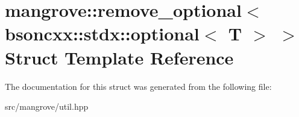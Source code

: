 \hypertarget{structmangrove_1_1remove__optional_3_01bsoncxx_1_1stdx_1_1optional_3_01T_01_4_01_4}{}\section{mangrove\+:\+:remove\+\_\+optional$<$ bsoncxx\+:\+:stdx\+:\+:optional$<$ T $>$ $>$ Struct Template Reference}
\label{structmangrove_1_1remove__optional_3_01bsoncxx_1_1stdx_1_1optional_3_01T_01_4_01_4}


The documentation for this struct was generated from the following file\+:\begin{DoxyCompactItemize}
\item 
src/mangrove/util.\+hpp\end{DoxyCompactItemize}
